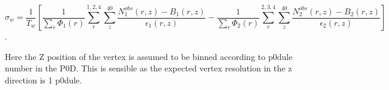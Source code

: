 \begin{equation}
\sigma_w = \frac{1}{T_w}\left[\frac{1}{\sum\limits_r \Phi_1(r)}\sum\limits_{r}^{1,2,4} \sum\limits_{z}^{40} \frac{N^{obs}_1(r,z)-B_1(r,z)}{\epsilon_1(r,z)}-\frac{1}{\sum\limits_r \Phi_2(r)}\sum\limits_{r}^{2,3,4} \sum\limits_{z}^{40} \frac{N^{obs}_2(r,z)-B_2(r,z)}{\epsilon_2(r,z)}\right]
\label{eqn:xsec6}
\end{equation}.

Here the Z position of the vertex is assumed to be binned according to p0dule number in the P0D. This is sensible as the expected vertex resolution in the z direction is 1 p0dule.
